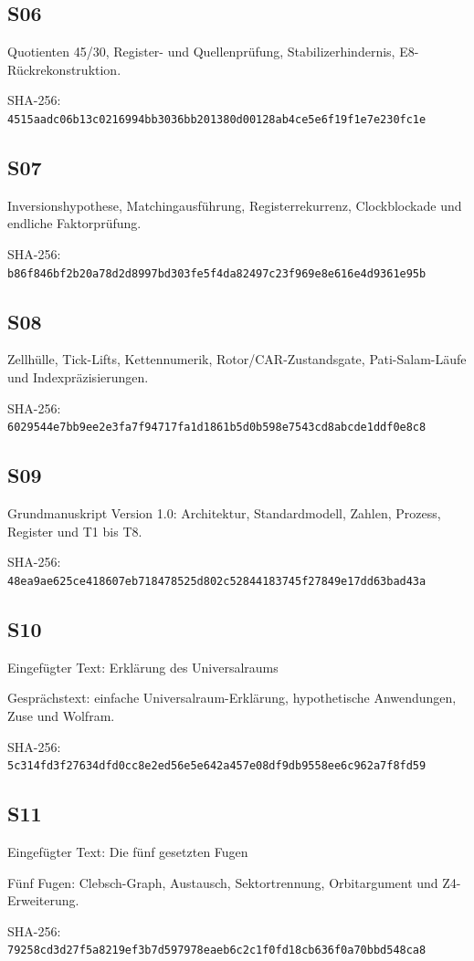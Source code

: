 \subsection*{S06}
\par
Quotienten 45/30, Register- und Quellenprüfung, Stabilizerhindernis, E8-Rückrekonstruktion.
{\footnotesize SHA-256: \texttt{4515aadc06b13c0216994bb3036bb201}\newline\texttt{380d00128ab4ce5e6f19f1e7e230fc1e}\par}
\needspace{32mm}
\subsection*{S07}
\par
Inversionshypothese, Matchingausführung, Registerrekurrenz, Clockblockade und endliche Faktorprüfung.
{\footnotesize SHA-256: \texttt{b86f846bf2b20a78d2d8997bd303fe5f}\newline\texttt{4da82497c23f969e8e616e4d9361e95b}\par}
\needspace{32mm}
\subsection*{S08}
\par
Zellhülle, Tick-Lifts, Kettennumerik, Rotor/CAR-Zustandsgate, Pati-Salam-Läufe und Indexpräzisierungen.
{\footnotesize SHA-256: \texttt{6029544e7bb9ee2e3fa7f94717fa1d18}\newline\texttt{61b5d0b598e7543cd8abcde1ddf0e8c8}\par}
\needspace{32mm}
\subsection*{S09}
\par
Grundmanuskript Version 1.0: Architektur, Standardmodell, Zahlen, Prozess, Register und T1 bis T8.
{\footnotesize SHA-256: \texttt{48ea9ae625ce418607eb718478525d80}\newline\texttt{2c52844183745f27849e17dd63bad43a}\par}
\needspace{32mm}
\subsection*{S10}
Eingefügter Text: Erklärung des Universalraums\par
Gesprächstext: einfache Universalraum-Erklärung, hypothetische Anwendungen, Zuse und Wolfram.
{\footnotesize SHA-256: \texttt{5c314fd3f27634dfd0cc8e2ed56e5e64}\newline\texttt{2a457e08df9db9558ee6c962a7f8fd59}\par}
\needspace{32mm}
\subsection*{S11}
Eingefügter Text: Die fünf gesetzten Fugen\par
Fünf Fugen: Clebsch-Graph, Austausch, Sektortrennung, Orbitargument und Z4-Erweiterung.
{\footnotesize SHA-256: \texttt{79258cd3d27f5a8219ef3b7d597978ea}\newline\texttt{eb6c2c1f0fd18cb636f0a70bbd548ca8}\par}
